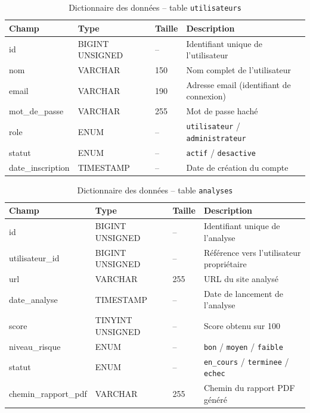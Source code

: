 \begin{table}[H]
  \centering
  \caption{Dictionnaire des donn\'ees -- table \texttt{utilisateurs}}
  \begin{tabular}{lllp{6cm}}
    \toprule
    \textbf{Champ} & \textbf{Type} & \textbf{Taille} & \textbf{Description} \\
    \midrule
    id & BIGINT UNSIGNED & -- & Identifiant unique de l'utilisateur \\
    nom & VARCHAR & 150 & Nom complet de l'utilisateur \\
    email & VARCHAR & 190 & Adresse email (identifiant de connexion) \\
    mot\_de\_passe & VARCHAR & 255 & Mot de passe hach\'e \\
    role & ENUM & -- & \texttt{utilisateur} / \texttt{administrateur} \\
    statut & ENUM & -- & \texttt{actif} / \texttt{desactive} \\
    date\_inscription & TIMESTAMP & -- & Date de cr\'eation du compte \\
    \bottomrule
  \end{tabular}
\end{table}

\begin{table}[H]
  \centering
  \caption{Dictionnaire des donn\'ees -- table \texttt{analyses}}
  \begin{tabular}{lllp{6cm}}
    \toprule
    \textbf{Champ} & \textbf{Type} & \textbf{Taille} & \textbf{Description} \\
    \midrule
    id & BIGINT UNSIGNED & -- & Identifiant unique de l'analyse \\
    utilisateur\_id & BIGINT UNSIGNED & -- & R\'ef\'erence vers l'utilisateur propri\'etaire \\
    url & VARCHAR & 255 & URL du site analys\'e \\
    date\_analyse & TIMESTAMP & -- & Date de lancement de l'analyse \\
    score & TINYINT UNSIGNED & -- & Score obtenu sur 100 \\
    niveau\_risque & ENUM & -- & \texttt{bon} / \texttt{moyen} / \texttt{faible} \\
    statut & ENUM & -- & \texttt{en\_cours} / \texttt{terminee} / \texttt{echec} \\
    chemin\_rapport\_pdf & VARCHAR & 255 & Chemin du rapport PDF g\'en\'er\'e \\
    \bottomrule
  \end{tabular}
\end{table}

